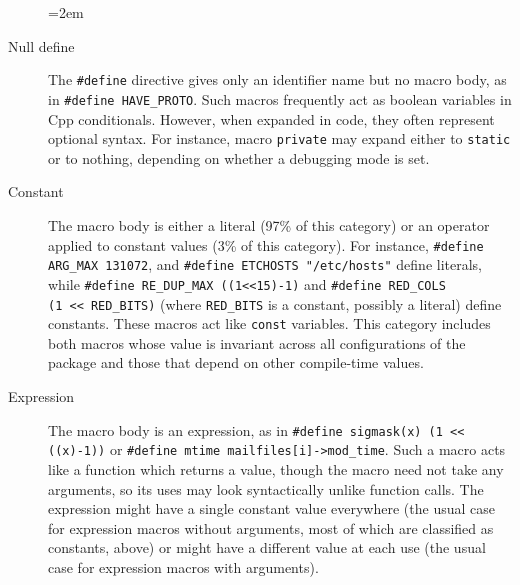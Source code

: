 \documentclass[10pt]{article}
\begin{document}
\begin{description}
  \sloppy
  \emergencystretch=2em

\item[Null define]  The {\tt \#define} directive gives only an
  identifier name but no macro body, as in {\tt \#define
  \verb|HAVE_PROTO|}\@.  Such macros frequently act as boolean variables in
Cpp conditionals.  However, when expanded in code,
they often represent optional syntax.  For
instance, macro {\tt private} may expand either to {\tt static} or to
nothing, depending on whether a debugging mode is set.

\item[Constant] The macro body is either a literal (97\% of this category)
  or an operator applied to constant values (3\% of this category).  For
  instance, {\tt \#define \verb|ARG_MAX| 131072}, and {\tt \#define
  ETCHOSTS "/etc/hosts"} define literals, while {\tt \#define
\verb|RE_DUP_MAX| ((1<<15)-1)} and {\tt \#define \verb|RED_COLS| (1~<<~\verb|RED_BITS|)} (where \verb|RED_BITS| is a constant, possibly a literal)
define constants.  These macros act like {\tt const} variables.  This
category includes both macros whose value is invariant across all
configurations of the package and those that depend on other compile-time
values.


\item[Expression]  The macro body is an expression, as in {\tt \#define
  sigmask(x) (1 << ((x)-1))} or {\tt \#define mtime mailfiles[i]->\verb|mod_time|}.
Such a macro acts like a function which returns a value, though the
macro need not take any arguments, so its uses may look syntactically
unlike function calls. 
The expression might have a single constant value everywhere (the usual
case for expression macros without arguments, most of which are classified
as constants, above) or might have a different value at each use (the usual
case for expression macros with arguments).


\end{description}
\end{document}
